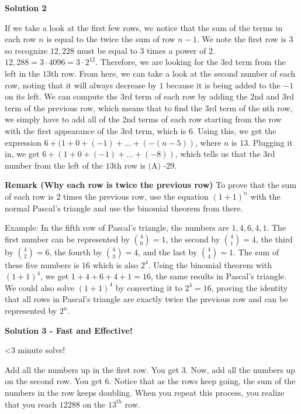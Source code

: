 \begin{enumerate}
\textbf{Solution 2}

If we take a look at the first few rows, we notice that the sum of the terms in each row $n$ is equal to the twice the sum of row $n-1$. We note the first row is $3$ so recognize $12,228$ must be equal to $3$ times a power of $2$. $12,288=3\cdot 4096=3 \cdot 2^{12}$. Therefore, we are looking for the $3$rd term from the left in the $13$th row. From here, we can take a look at the second number of each row, noting that it will always decrease by $1$ because it is being added to the $-1$ on its left. We can compute the $3$rd term of each row by adding the $2$nd and $3$rd term of the previous row, which means that to find the $3$rd term of the nth row, we simply have to add all of the 2nd terms of each row starting from the row with the first appearance of the $3$rd term, which is $6$. Using this, we get the expression $6+(1+0+(-1)+...+(-(n-5))$, where $n$ is $13$. Plugging it in, we get $6+(1+0+(-1)+...+(-8))$, which tells us that the $3$rd number from the left of the $13$th row is $\boxed{\text{(A) -29}}$.

 


 \textbf{Remark (Why each row is twice the previous row)} To prove that the sum of each row is $2$ times the previous row, use the equation ${(1+1)}^n$ with the normal Pascal's triangle and use the binomial theorem from there.

 Example: In the fifth row of Pascal's triangle, the numbers are $1, 4, 6, 4, 1$. The first number can be represented by ${4 \choose 0} = 1$, the second by ${4 \choose 1} = 4$, the third by  ${4 \choose 2} = 6$, the fourth by  ${4 \choose 3} = 4$, and the last by  ${4 \choose 4} = 1$. The sum of these five numbers is $16$ which is also $2^{4}$. Using the binomial theorem with ${(1+1)}^4$, we get $1 + 4 + 6 + 4 + 1 = 16$, the same results in Pascal's triangle. We could also solve ${(1+1)}^4$ by converting it to $2^4 = 16$, proving the identity that all rows in Pascal's triangle are exactly twice the previous row and can be represented by $2^{n}$.

 



\textbf{Solution 3 - Fast  and Effective!}

<3 minute solve!

 Add all the numbers up in the first row. You get $3.$ Now, add all the numbers up on the second row. You get $6.$ Notice that as the rows keep going, the sum of the numbers in the row keeps doubling. When you repeat this process, you realize that you reach $12288$ on the $13^{th}$ row.


\end{enumerate}
